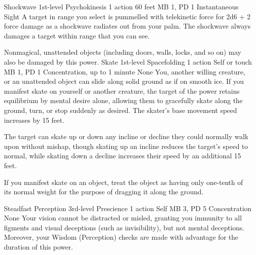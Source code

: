 \DndPowerHeader%
    {Shockwave\label{pwr:shockwave}}
    {1st-level Psychokinesis}
    {1 action}
    {60 feet}
    {MB 1, PD 1}
    {Instantaneous}
    {Sight}
A target in range you select is pummelled
with telekinetic force for 2d6 + 2 force damage as a shockwave
radiates out from your palm. The shockwave always damages
a target within range that you can see.

Nonmagical, unattended objects (including doors, walls, locks,
and so on) may also be damaged by this power.
\DndPowerHeader%
    {Skate\label{pwr:skate}}
    {1st-level Spacefolding}
    {1 action}
    {Self or touch}
    {MB 1, PD 1}
    {Concentration, up to 1 minute}
    {None}
You, another willing creature, or an unattended
object can slide along solid ground as if on smooth ice. If
you manifest skate on yourself or another creature, the target
of the power retains equilibrium by mental desire alone, allowing
them to gracefully skate along the ground, turn, or stop suddenly
as desired. The skater's base movement speed increases by
15 feet.

The target can skate up or down any incline or decline they
could normally walk upon without mishap, though skating up
an incline reduces the target's speed to normal, while skating
down a decline increases their speed by an additional 15 feet.

If you manifest skate on an object, treat the object as having
only one-tenth of its normal weight for the purpose of dragging
it along the ground.

\DndPowerHeader%
    {Steadfast Perception\label{pwr:steadfast-perception}}
    {3rd-level Prescience}
    {1 action}
    {Self}
    {MB 3, PD 5}
    {Concentration}
    {None}
Your vision cannot be distracted or misled,
granting you immunity to all figments and visual deceptions
(such as invisibility), but not mental deceptions. Moreover,
your Wisdom (Perception) checks are made with advantage for
the duration of this power.

